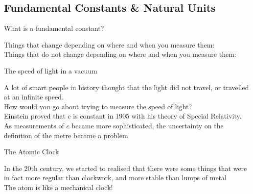 \subsection{Fundamental Constants \& Natural Units}
\begin{frame}{What is a fundamental constant?}

Things that change depending on where and when you measure them:\\[10ex]

Things that do not change depending on where and when you measure them:\\[10ex]


\end{frame}


\begin{frame}{The speed of light in a vacuum}

A lot of smart people in history thought that the light did not travel, or travelled at an infinite speed.\\[2ex]

How would you go about trying to measure the speed of light?\\[5ex]

Einstein proved that $c$ is constant in 1905 with his theory of Special Relativity.\\[2ex]

As measurements of $c$ became more sophisticated, the uncertainty on the definition of the metre became a problem\\[1ex]


\end{frame}


\begin{frame}{The Atomic Clock}

In the 20th century, we started to realised that there were some things that were in fact more regular than clockwork, and more stable than lumps of metal\\[1ex]

The atom is like a mechanical clock!\\[16ex]


\end{frame}


